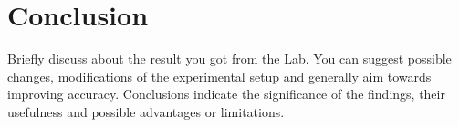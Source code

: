 \section{Conclusion}
Briefly discuss about the result you got from the Lab. You can suggest possible changes, modifications of the experimental setup and generally aim towards improving accuracy. Conclusions indicate the significance of the findings, their usefulness and possible advantages or limitations.
